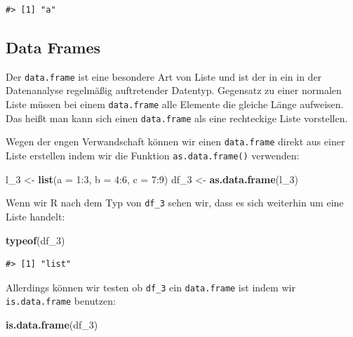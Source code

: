 \documentclass[]{tufte-book}
\newenvironment{Shaded}{}{}
\newcommand{\KeywordTok}[1]{\textcolor[rgb]{0.00,0.44,0.13}{\textbf{#1}}}
\newcommand{\DataTypeTok}[1]{\textcolor[rgb]{0.56,0.13,0.00}{#1}}
\newcommand{\DecValTok}[1]{\textcolor[rgb]{0.25,0.63,0.44}{#1}}
\newcommand{\StringTok}[1]{\textcolor[rgb]{0.25,0.44,0.63}{#1}}
\newcommand{\OperatorTok}[1]{\textcolor[rgb]{0.40,0.40,0.40}{#1}}
\newcommand{\NormalTok}[1]{#1}
\begin{document}
\begin{verbatim}
#> [1] "a"
\end{verbatim}

\subsection{Data Frames}\label{data-frames}

Der \texttt{data.frame} ist eine besondere Art von Liste und ist der in
ein in der Datenanalyse regelmäßig auftretender Datentyp. Gegensatz zu
einer normalen Liste müssen bei einem \texttt{data.frame} alle Elemente
die gleiche Länge aufweisen. Das heißt man kann sich einen
\texttt{data.frame} als eine rechteckige Liste vorstellen.

Wegen der engen Verwandschaft können wir einen \texttt{data.frame}
direkt aus einer Liste erstellen indem wir die Funktion
\texttt{as.data.frame()} verwenden:

\begin{Shaded}
\begin{Highlighting}[]
\NormalTok{l_}\DecValTok{3}\NormalTok{ <-}\StringTok{ }\KeywordTok{list}\NormalTok{(}\DataTypeTok{a =} \DecValTok{1}\OperatorTok{:}\DecValTok{3}\NormalTok{, }\DataTypeTok{b =} \DecValTok{4}\OperatorTok{:}\DecValTok{6}\NormalTok{, }\DataTypeTok{c =} \DecValTok{7}\OperatorTok{:}\DecValTok{9}\NormalTok{)}
\NormalTok{df_}\DecValTok{3}\NormalTok{ <-}\StringTok{ }\KeywordTok{as.data.frame}\NormalTok{(l_}\DecValTok{3}\NormalTok{)}
\end{Highlighting}
\end{Shaded}

Wenn wir R nach dem Typ von \texttt{df\_3} sehen wir, dass es sich
weiterhin um eine Liste handelt:

\begin{Shaded}
\begin{Highlighting}[]
\KeywordTok{typeof}\NormalTok{(df_}\DecValTok{3}\NormalTok{)}
\end{Highlighting}
\end{Shaded}

\begin{verbatim}
#> [1] "list"
\end{verbatim}

Allerdings können wir testen ob \texttt{df\_3} ein \texttt{data.frame}
ist indem wir \texttt{is.data.frame} benutzen:

\begin{Shaded}
\begin{Highlighting}[]
\KeywordTok{is.data.frame}\NormalTok{(df_}\DecValTok{3}\NormalTok{)}
\end{Highlighting}
\end{Shaded}
\end{document}
